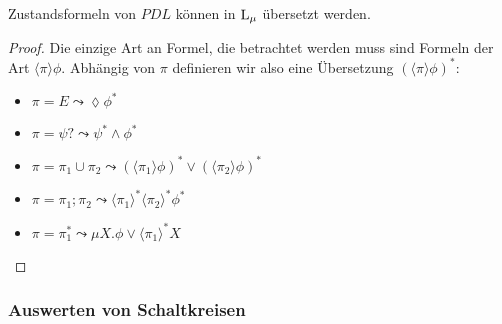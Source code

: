 \begin{satz}
	Zustandsformeln von $PDL$ können in $\operatorname{L}_\mu$ übersetzt werden.
\end{satz}
\begin{proof}
	Die einzige Art an Formel, die betrachtet werden muss sind Formeln der Art $\langle \pi \rangle \phi$. Abhängig von $\pi$ definieren wir also eine Übersetzung $(\langle\pi\rangle \phi)^\ast$:
	\begin{itemize}
		\item $\pi = E \leadsto \lozenge\phi^\ast$
		\item $\pi=\psi? \leadsto \psi^\ast \land \phi^\ast$
		\item $\pi = \pi_1\cup\pi_2 \leadsto (\langle\pi_1\rangle\phi)^\ast \lor(\langle\pi_2\rangle\phi)^\ast$
		\item $\pi=\pi_1;\pi_2 \leadsto \langle\pi_1\rangle^\ast \langle\pi_2\rangle^\ast \phi^\ast$
		\item $\pi=\pi_1^\ast \leadsto \mu X .\phi\lor \langle\pi_1\rangle^\ast X$
	\end{itemize}
\end{proof}

\subsubsection*{Auswerten von Schaltkreisen}


